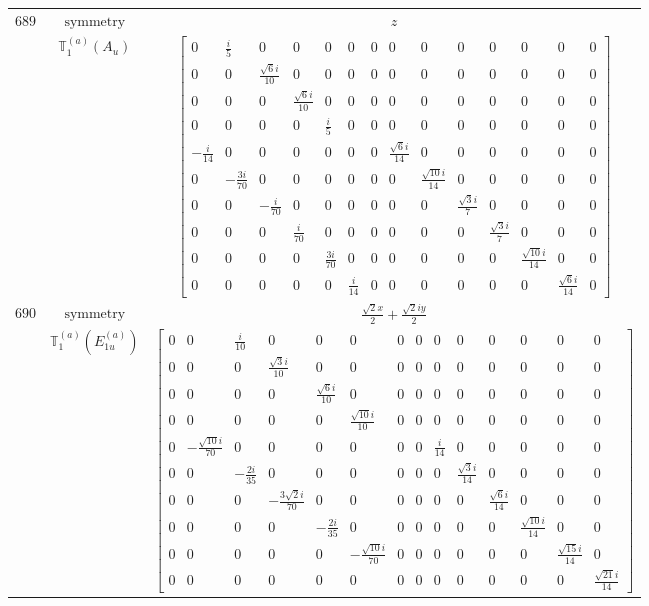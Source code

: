 \documentclass[fleqn,8pt,landscape]{jsarticle}
\begin{document}
\begin{longtable}{ccc}
$ 689 $ & $ \text{symmetry} $ & $ z $ \\
$  $ & $ \mathbb{T}_{1}^{(a)}(A_{u}) $ & $ \begin{bmatrix} 0 & \frac{i}{5} & 0 & 0 & 0 & 0 & 0 & 0 & 0 & 0 & 0 & 0 & 0 & 0 \\ 0 & 0 & \frac{\sqrt{6} i}{10} & 0 & 0 & 0 & 0 & 0 & 0 & 0 & 0 & 0 & 0 & 0 \\ 0 & 0 & 0 & \frac{\sqrt{6} i}{10} & 0 & 0 & 0 & 0 & 0 & 0 & 0 & 0 & 0 & 0 \\ 0 & 0 & 0 & 0 & \frac{i}{5} & 0 & 0 & 0 & 0 & 0 & 0 & 0 & 0 & 0 \\ - \frac{i}{14} & 0 & 0 & 0 & 0 & 0 & 0 & \frac{\sqrt{6} i}{14} & 0 & 0 & 0 & 0 & 0 & 0 \\ 0 & - \frac{3 i}{70} & 0 & 0 & 0 & 0 & 0 & 0 & \frac{\sqrt{10} i}{14} & 0 & 0 & 0 & 0 & 0 \\ 0 & 0 & - \frac{i}{70} & 0 & 0 & 0 & 0 & 0 & 0 & \frac{\sqrt{3} i}{7} & 0 & 0 & 0 & 0 \\ 0 & 0 & 0 & \frac{i}{70} & 0 & 0 & 0 & 0 & 0 & 0 & \frac{\sqrt{3} i}{7} & 0 & 0 & 0 \\ 0 & 0 & 0 & 0 & \frac{3 i}{70} & 0 & 0 & 0 & 0 & 0 & 0 & \frac{\sqrt{10} i}{14} & 0 & 0 \\ 0 & 0 & 0 & 0 & 0 & \frac{i}{14} & 0 & 0 & 0 & 0 & 0 & 0 & \frac{\sqrt{6} i}{14} & 0 \end{bmatrix} $ \\ \hline
$ 690 $ & $ \text{symmetry} $ & $ \frac{\sqrt{2} x}{2} + \frac{\sqrt{2} i y}{2} $ \\
$  $ & $ \mathbb{T}_{1}^{(a)}(E_{1u}^{(a)}) $ & $ \begin{bmatrix} 0 & 0 & \frac{i}{10} & 0 & 0 & 0 & 0 & 0 & 0 & 0 & 0 & 0 & 0 & 0 \\ 0 & 0 & 0 & \frac{\sqrt{3} i}{10} & 0 & 0 & 0 & 0 & 0 & 0 & 0 & 0 & 0 & 0 \\ 0 & 0 & 0 & 0 & \frac{\sqrt{6} i}{10} & 0 & 0 & 0 & 0 & 0 & 0 & 0 & 0 & 0 \\ 0 & 0 & 0 & 0 & 0 & \frac{\sqrt{10} i}{10} & 0 & 0 & 0 & 0 & 0 & 0 & 0 & 0 \\ 0 & - \frac{\sqrt{10} i}{70} & 0 & 0 & 0 & 0 & 0 & 0 & \frac{i}{14} & 0 & 0 & 0 & 0 & 0 \\ 0 & 0 & - \frac{2 i}{35} & 0 & 0 & 0 & 0 & 0 & 0 & \frac{\sqrt{3} i}{14} & 0 & 0 & 0 & 0 \\ 0 & 0 & 0 & - \frac{3 \sqrt{2} i}{70} & 0 & 0 & 0 & 0 & 0 & 0 & \frac{\sqrt{6} i}{14} & 0 & 0 & 0 \\ 0 & 0 & 0 & 0 & - \frac{2 i}{35} & 0 & 0 & 0 & 0 & 0 & 0 & \frac{\sqrt{10} i}{14} & 0 & 0 \\ 0 & 0 & 0 & 0 & 0 & - \frac{\sqrt{10} i}{70} & 0 & 0 & 0 & 0 & 0 & 0 & \frac{\sqrt{15} i}{14} & 0 \\ 0 & 0 & 0 & 0 & 0 & 0 & 0 & 0 & 0 & 0 & 0 & 0 & 0 & \frac{\sqrt{21} i}{14} \end{bmatrix} $ \\ \hline

\end{longtable}
\end{document}
